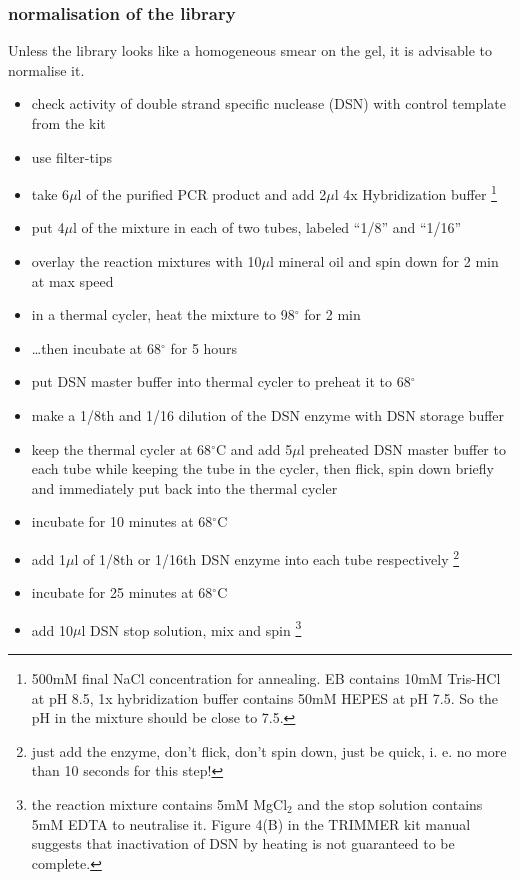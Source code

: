 \subsubsection
{normalisation of the library}
Unless the library looks like a homogeneous smear on the gel, it is advisable to normalise it.
\begin{itemize}
\item check activity of double strand specific nuclease (DSN) with control template from the kit
\item {\color{red}use filter-tips}
\item take 6$\mu$l of the purified PCR product and add 2$\mu$l 4x Hybridization buffer \footnote{500mM final NaCl concentration for annealing. EB contains 10mM Tris-HCl at pH 8.5, 1x hybridization buffer contains 50mM HEPES at pH 7.5. So the pH in the mixture should be close to 7.5.}
\item put 4$\mu$l of the mixture in each of two tubes, labeled ``1/8'' and ``1/16''
\item overlay the reaction mixtures with 10$\mu$l mineral oil and spin down for 2 min at max speed
\item in a thermal cycler, heat the mixture to 98$^{\circ}$ for 2 min
\item \ldots then incubate at 68$^{\circ}$ for 5 hours
\item put DSN master buffer into thermal cycler to preheat it to 68$^{\circ}$
\item make a 1/8th and 1/16 dilution of the DSN enzyme with DSN storage buffer
\item keep the thermal cycler at 68$^{\circ}$C and add 5$\mu$l preheated DSN master buffer to each tube while keeping the tube in the cycler, then flick, spin down briefly and immediately put back into the thermal cycler 
\item incubate for 10 minutes at 68$^{\circ}$C 
\item add 1$\mu$l of 1/8th or 1/16th DSN enzyme into each tube respectively \footnote{just add the enzyme, don't flick, don't spin down, just be quick, i. e. no more than 10 seconds for this step!}
\item incubate for 25 minutes at 68$^{\circ}$C 
\item add 10$\mu$l DSN stop solution, mix and spin \footnote{the reaction mixture contains 5mM MgCl$_{2}$ and the stop solution contains 5mM EDTA to neutralise it. Figure 4(B) in the TRIMMER kit manual suggests that inactivation of DSN by heating is not guaranteed to be complete.}
\end{itemize}

